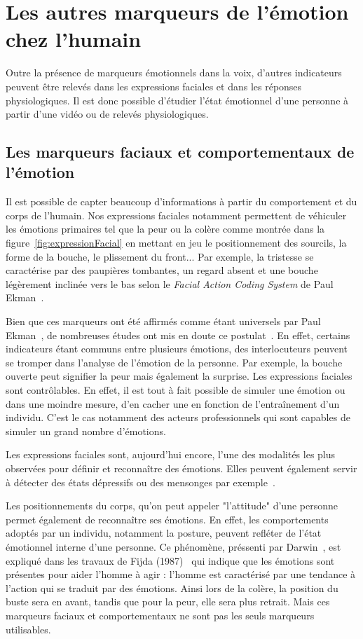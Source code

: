 \section{Les autres marqueurs de l'émotion chez l'humain}
Outre la présence de marqueurs émotionnels dans la voix, d'autres indicateurs peuvent être relevés dans les expressions faciales et dans les réponses physiologiques. Il est donc possible d'étudier l'état émotionnel d'une personne à partir d'une vidéo ou de relevés physiologiques.

\subsection{Les marqueurs faciaux et comportementaux de l'émotion}


Il est possible de capter beaucoup d'informations à partir du comportement et du corps de l'humain. %
Nos expressions faciales notamment permettent de véhiculer les émotions primaires tel que la peur ou la colère comme montrée dans la figure~\ref{fig:expressionFacial} en mettant en jeu le positionnement des sourcils, la forme de la bouche, le plissement du front...
Par exemple, la tristesse se caractérise par des paupières tombantes, un regard absent et une bouche légèrement inclinée vers le bas selon le \textit{Facial Action Coding System} de Paul Ekman~\cite{Ekman1978}.

Bien que ces marqueurs ont été affirmés comme étant universels par Paul Ekman~\cite{Ekman1978}, de nombreuses études ont mis en doute ce postulat~\cite{Leys2010,Gendron2014}. En effet, certains indicateurs étant communs entre plusieurs émotions, des interlocuteurs peuvent se tromper dans l'analyse de l'émotion de la personne. Par exemple, la bouche ouverte peut signifier la peur mais également la surprise. Les expressions faciales sont contrôlables. En effet, il est tout à fait possible de simuler une émotion ou dans une moindre mesure, d'en cacher une en fonction de l’entraînement d'un individu. C'est le cas notamment des acteurs professionnels qui sont capables de simuler un grand nombre d'émotions.

Les expressions faciales sont, aujourd'hui encore, l'une des modalités les plus observées pour définir et reconnaître des émotions. Elles peuvent également servir à détecter des états dépressifs ou des mensonges par exemple~\cite{Suslow2001,Owayjan2012}.

Les positionnements du corps, qu'on peut appeler "l'attitude" d'une personne permet également de reconnaître ses émotions. En effet, les comportements adoptés par un individu, notamment la posture, peuvent refléter de l'état émotionnel interne d'une personne. Ce phénomène, préssenti par Darwin~\cite{Darwin1872}, est expliqué dans les travaux de Fijda (1987)~\cite{Fijda1987} qui indique que les émotions sont présentes pour aider l'homme à agir : l'homme est caractérisé par une tendance à l'action qui se traduit par des émotions. Ainsi lors de la colère, la position du buste sera en avant, tandis que pour la peur, elle sera plus retrait. Mais ces marqueurs faciaux et comportementaux ne sont pas les seuls marqueurs utilisables.

